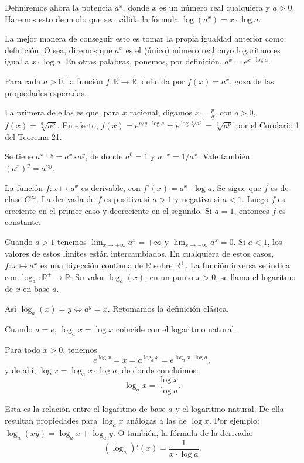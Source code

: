 \documentclass[12pt,oneside]{book}
\begin{document}
Definiremos ahora la potencia \(a^x\), donde \(x\) es un número real cualquiera y \(a > 0\). Haremos esto de modo que sea válida la fórmula \(\log(a^x) = x \cdot \log a\).

La mejor manera de conseguir esto es tomar la propia igualdad anterior como definición. O sea, diremos que \(a^x\) es el (único) número real cuyo logaritmo es igual a \(x \cdot \log a\). En otras palabras, ponemos, por definición, \(a^x = e^{x \cdot \log a}\).

Para cada \(a > 0\), la función \(f: \mathbb{R} \to \mathbb{R}\), definida por \(f(x) = a^x\), goza de las propiedades esperadas.

La primera de ellas es que, para \(x\) racional, digamos \(x = \frac{p}{q}\), con \(q > 0\), \(f(x) = \sqrt[q]{a^p}\). En efecto, \(f(x) = e^{p/q \cdot \log a} = e^{\log \sqrt[q]{a^p}} = \sqrt[q]{a^p}\) por el Corolario 1 del Teorema 21.

Se tiene \(a^{x+y} = a^x \cdot a^y\), de donde \(a^0 = 1\) y \(a^{-x} = 1/a^x\). Vale también \((a^x)^y = a^{xy}\).

La función \(f: x \mapsto a^x\) es derivable, con \(f'(x) = a^x \cdot \log a\). Se sigue que \(f\) es de clase \(C^\infty\). La derivada de \(f\) es positiva si \(a > 1\) y negativa si \(a < 1\). Luego \(f\) es creciente en el primer caso y decreciente en el segundo. Si \(a = 1\), entonces \(f\) es constante.

Cuando \(a > 1\) tenemos \(\lim_{x \to +\infty} a^x = +\infty\) y \(\lim_{x \to -\infty} a^x = 0\). Si \(a < 1\), los valores de estos límites están intercambiados. En cualquiera de estos casos, \(f: x \mapsto a^x\) es una biyección continua de \(\mathbb{R}\) sobre \(\mathbb{R}^+\). La función inversa se indica con \(\log_a: \mathbb{R}^+ \to \mathbb{R}\). Su valor \(\log_a(x)\), en un punto \(x > 0\), se llama el logaritmo de \(x\) en base \(a\).

Así \(\log_a(x) = y \Leftrightarrow a^y = x\). Retomamos la definición clásica.

Cuando \(a = e\), \(\log_a x = \log x\) coincide con el logaritmo natural.

Para todo \(x > 0\), tenemos
\[e^{\log x} = x = a^{\log_a x} = e^{\log_a x \cdot \log a},\]
y de ahí, \(\log x = \log_a x \cdot \log a\), de donde concluimos:
\[
\log_a x = \frac{\log x}{\log a}.
\]

Esta es la relación entre el logaritmo de base \(a\) y el logaritmo natural. De ella resultan propiedades para \(\log_a x\) análogas a las de \(\log x\). Por ejemplo: \(\log_a (xy) = \log_a x + \log_a y\). O también, la fórmula de la derivada:
\[
(\log_a)'(x) = \frac{1}{x \cdot \log a}.
\]
\end{document}
